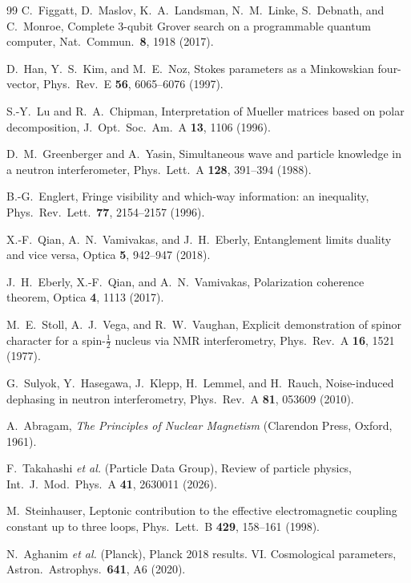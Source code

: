 \documentclass[aps,pra,onecolumn,superscriptaddress,nofootinbib,10pt]{revtex4-2}
\theoremstyle{definition}
\theoremstyle{remark}
\begin{document}
\begin{thebibliography}{99}
 C.~Figgatt, D.~Maslov, K.~A.~Landsman, N.~M.~Linke, S.~Debnath, and C.~Monroe, Complete 3-qubit Grover search on a programmable quantum computer, Nat.\ Commun.\ \textbf{8}, 1918 (2017).

 D.~Han, Y.~S.~Kim, and M.~E.~Noz, Stokes parameters as a Minkowskian four-vector, Phys.\ Rev.\ E \textbf{56}, 6065--6076 (1997).

 S.-Y.~Lu and R.~A.~Chipman, Interpretation of Mueller matrices based on polar decomposition, J.\ Opt.\ Soc.\ Am.\ A \textbf{13}, 1106 (1996).

 D.~M.~Greenberger and A.~Yasin, Simultaneous wave and particle knowledge in a neutron interferometer, Phys.\ Lett.\ A \textbf{128}, 391--394 (1988).

 B.-G.~Englert, Fringe visibility and which-way information: an inequality, Phys.\ Rev.\ Lett.\ \textbf{77}, 2154--2157 (1996).

 X.-F.~Qian, A.~N.~Vamivakas, and J.~H.~Eberly, Entanglement limits duality and vice versa, Optica \textbf{5}, 942--947 (2018).

 J.~H.~Eberly, X.-F.~Qian, and A.~N.~Vamivakas, Polarization coherence theorem, Optica \textbf{4}, 1113 (2017).

 M.~E.~Stoll, A.~J.~Vega, and R.~W.~Vaughan, Explicit demonstration of spinor character for a spin-$\tfrac12$ nucleus via NMR interferometry, Phys.\ Rev.\ A \textbf{16}, 1521 (1977).

 G.~Sulyok, Y.~Hasegawa, J.~Klepp, H.~Lemmel, and H.~Rauch, Noise-induced dephasing in neutron interferometry, Phys.\ Rev.\ A \textbf{81}, 053609 (2010).

 A.~Abragam, \emph{The Principles of Nuclear Magnetism} (Clarendon Press, Oxford, 1961).

 F.~Takahashi \emph{et al.} (Particle Data Group), Review of particle physics, Int.\ J.\ Mod.\ Phys.\ A \textbf{41}, 2630011 (2026).

 M.~Steinhauser, Leptonic contribution to the effective electromagnetic coupling constant up to three loops, Phys.\ Lett.\ B \textbf{429}, 158--161 (1998).

 N.~Aghanim \emph{et al.} (Planck), Planck 2018 results. VI. Cosmological parameters, Astron.\ Astrophys.\ \textbf{641}, A6 (2020).


\end{thebibliography}
\end{document}

